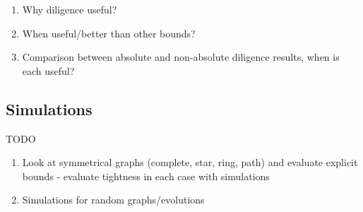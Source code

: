 
\begin{enumerate}
	\item Why diligence useful?
	\item When useful/better than other bounds?
	\item Comparison between absolute and non-absolute  diligence results, when is each useful?
\end{enumerate}

\subsection{Simulations}

TODO 

\begin{enumerate}
	\item Look at symmetrical graphs (complete, star, ring, path) and evaluate explicit bounds - evaluate tightness in each case with simulations
	\item Simulations for random graphs/evolutions
\end{enumerate}